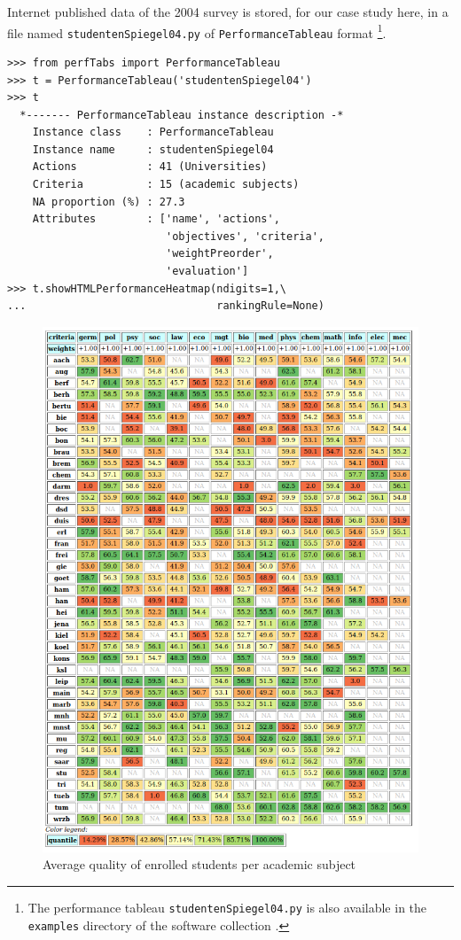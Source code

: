 Internet published data of the 2004 survey is stored, for our case study here, in a file named \texttt{studentenSpiegel04.py} of \texttt{PerformanceTableau} format \footnote{The performance tableau \texttt{studentenSpiegel04.py} is also available in the \texttt{examples} directory of the \Digraph software collection \citep{BIS-2021}.}.
\begin{lstlisting}[caption={The 2004 Spiegel students survey data},label=list:14.1]
>>> from perfTabs import PerformanceTableau
>>> t = PerformanceTableau('studentenSpiegel04')
>>> t
  *------- PerformanceTableau instance description -*
    Instance class    : PerformanceTableau
    Instance name     : studentenSpiegel04
    Actions           : 41 (Universities)
    Criteria          : 15 (academic subjects)
    NA proportion (%) : 27.3
    Attributes        : ['name', 'actions',
                         'objectives', 'criteria',
                         'weightPreorder',
                         'evaluation']
>>> t.showHTMLPerformanceHeatmap(ndigits=1,\
...                              rankingRule=None)
\end{lstlisting}
\begin{figure}[h]
\includegraphics[width=\hsize]{Figures/14-1-ratingData.png}
\caption{Average quality of enrolled students per academic subject}
\label{fig:14.1}       %
\end{figure}

